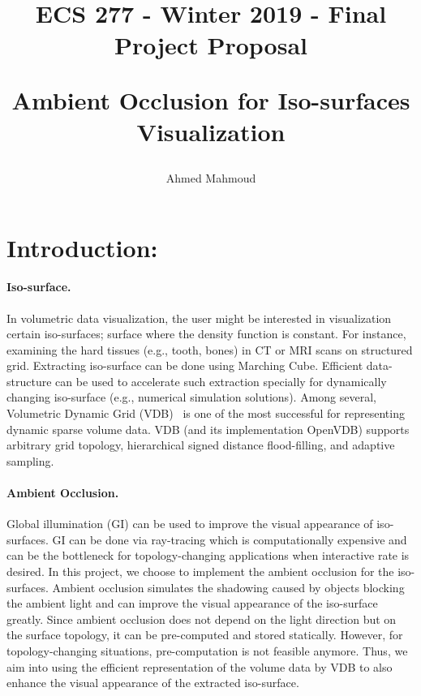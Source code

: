 \documentclass[a4paper,10pt]{article}
\title{
\begin{Large}
ECS 277 - Winter 2019 - Final Project Proposal\\\vspace{3.0mm}
\end{Large}
Ambient Occlusion for Iso-surfaces Visualization
}
\author{Ahmed Mahmoud}
\date{}
\begin{document}
\maketitle

\section{Introduction:}


\paragraph{Iso-surface.} In volumetric data visualization, the user might be interested in visualization certain iso-surfaces; surface where the density function is constant. For instance, examining the hard tissues (e.g., tooth, bones) in CT or MRI scans on structured grid. Extracting iso-surface can be done using Marching Cube. Efficient data-structure can be used to accelerate such extraction specially for dynamically changing iso-surface (e.g., numerical simulation solutions). Among several, Volumetric Dynamic Grid (VDB)~\citep{museth2013vdb} is one of the most successful for representing dynamic sparse volume data. VDB (and its implementation OpenVDB) supports arbitrary grid topology, hierarchical signed distance flood-filling, and adaptive sampling.

\paragraph{Ambient Occlusion.} Global illumination (GI) can be used to improve the visual appearance of iso-surfaces. 
GI can be done via ray-tracing which is computationally expensive and can be the bottleneck for topology-changing applications when interactive rate is desired. In this project, we choose to implement the ambient occlusion for the iso-surfaces. Ambient occlusion simulates the shadowing caused by objects blocking the ambient light and can improve the visual appearance of the iso-surface greatly. Since ambient occlusion does not depend on the light direction but on the surface topology, it can be pre-computed and stored statically. However, for topology-changing situations, pre-computation is not feasible anymore. Thus, we aim into using the efficient representation of the volume data by VDB to also enhance the visual appearance of the extracted iso-surface. 
\\
\end{document}
